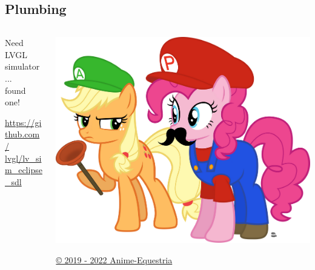\documentclass{beamer}
\begin{document}
\subsection{Plumbing}
\begin{frame}{}

  \begin{columns}
  \begin{column}{0.4\textwidth}
    \centering
    Need LVGL simulator\\
    ...\\
    found one!

    \medskip

    \href{https://github.com/lvgl/lv_sim_eclipse_sdl}{
      https://github.com/\\\quad lvgl/lv\_sim\_eclipse\_sdl}

  \end{column}
  \begin{column}{0.6\textwidth}
    \includegraphics[width=\textwidth]{../pony_plumbing}

    \centering
    \small \href{https://www.deviantart.com/anime-equestria/art/Applepie-Plumbing-815463716}{© 2019 - 2022 Anime-Equestria}
  \end{column}
  \end{columns}

\end{frame}
\end{document}
